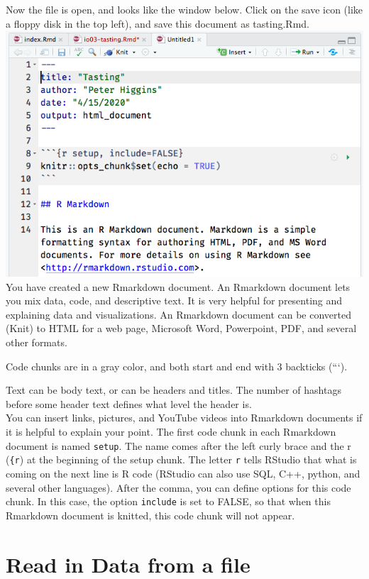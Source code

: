 \documentclass[]{book}
\begin{document}
Now the file is open, and looks like the window below. Click on the save icon (like a floppy disk in the top left), and save this document as tasting.Rmd.
\includegraphics{images/newrmd3.png}
You have created a new Rmarkdown document. An Rmarkdown document lets you mix data, code, and descriptive text. It is very helpful for presenting and explaining data and visualizations. An Rmarkdown document can be converted (Knit) to HTML for a web page, Microsoft Word, Powerpoint, PDF, and several other formats.

Code chunks are in a gray color, and both start and end with 3 backticks (```).

Text can be body text, or can be headers and titles. The number of hashtags before some header text defines what level the header is.\\
You can insert links, pictures, and YouTube videos into Rmarkdown documents if it is helpful to explain your point.
The first code chunk in each Rmarkdown document is named \texttt{setup}. The name comes after the left curly brace and the r (\texttt{\{r}) at the beginning of the setup chunk. The letter \texttt{r} tells RStudio that what is coming on the next line is R code (RStudio can also use SQL, C++, python, and several other languages). After the comma, you can define options for this code chunk. In this case, the option \texttt{include} is set to FALSE, so that when this Rmarkdown document is knitted, this code chunk will not appear.

\hypertarget{read-in-data-from-a-file}{%
\section{Read in Data from a file}\label{read-in-data-from-a-file}}
\end{document}
